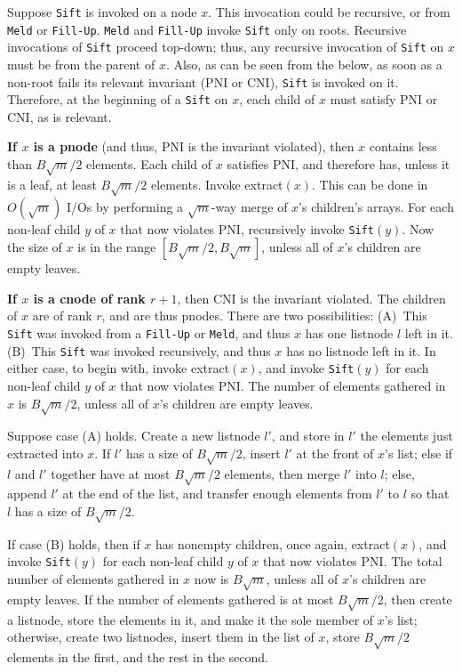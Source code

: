 Suppose {\tt Sift} is invoked on a node $x$. 
This invocation could be recursive, or from {\tt Meld} or {\tt Fill-Up}.
{\tt Meld} and {\tt Fill-Up} invoke {\tt Sift} only on roots.
Recursive invocations of {\tt Sift} proceed top-down; thus, any recursive
	invocation of {\tt Sift} on $x$ must be from the parent of $x$. 
Also, as can be seen from the below, 
	as soon as a non-root fails its relevant invariant (PNI or CNI),
	{\tt Sift} is invoked on it.
Therefore, at the beginning of a {\tt Sift} on $x$, each child of $x$ must
	satisfy PNI or CNI, as is relevant.   


{\bf If $x$ is a pnode} (and thus, PNI is the invariant violated), then
	$x$ contains less than $B\sqrt{m}/2$ elements.
Each child of $x$ satisfies PNI, and therefore has, unless it is a leaf,  
	at least $B\sqrt{m}/2$ elements.  
Invoke extract$(x)$.
This can be done in $O(\sqrt{m})$ I/Os by performing a $\sqrt{m}$-way merge of $x$'s children's arrays. 
For each non-leaf child $y$ of $x$ that now violates PNI, recursively invoke {\tt Sift}$(y)$.
Now the size of $x$ is in the range $[B\sqrt{m}/2, B\sqrt{m}]$, unless 
all of $x$'s children are empty leaves. 

{\bf If $x$ is a cnode of rank $r+1$}, then CNI is the invariant violated.
The children of $x$ are of rank $r$, and are thus pnodes.
There are two possibilities: (A)~This {\tt Sift} was invoked from a {\tt Fill-Up} or {\tt Meld}, and thus
	$x$ has one listnode $l$ left in it. (B)~This {\tt Sift} was invoked recursively, and thus
	$x$ has no listnode left in it.
In either case, to begin with, invoke extract$(x)$, and invoke {\tt Sift}$(y)$ 
	for each non-leaf child $y$ of $x$ that now violates PNI.
The number of elements gathered in $x$ is $B\sqrt{m}/2$, 
	unless all of $x$'s children are empty leaves. 
 
Suppose case (A) holds. 
Create a new listnode $l'$, and store in $l'$ the elements just extracted into $x$.
If $l'$ has a size of $B\sqrt{m}/2$, insert $l'$ at the front of $x$'s list;
	else if $l$ and $l'$ together have at most $B\sqrt{m}/2$ elements, then
	merge $l'$ into $l$;
	else, append $l'$ at the end of the list, and transfer enough elements
	from $l'$ to $l$ so that $l$ has a size of $B\sqrt{m}/2$.

If case (B) holds, then if $x$ has nonempty children, once again, extract$(x)$, and invoke {\tt Sift}$(y)$ 
	for each non-leaf child $y$ of $x$ that now violates PNI.
The total number of elements gathered in $x$ now is $B\sqrt{m}$, 
	unless all of $x$'s children are empty leaves. 
If the number of elements gathered is at most $B\sqrt{m}/2$,
	then create a listnode, store the elements in it, and make it the sole member
	of $x$'s list;
otherwise, create two listnodes, insert them in the list of $x$, store $B\sqrt{m}/2$ elements in the first, 
	and the rest in the second.
 
